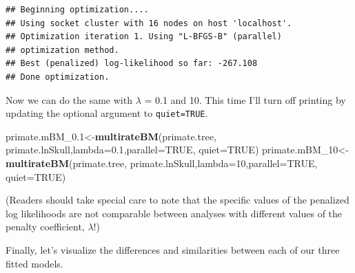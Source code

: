 \documentclass[fleqn,10pt,lineno]{wlpeerj} %
\newenvironment{Shaded}{\begin{snugshade}}{\end{snugshade}}
\newcommand{\AttributeTok}[1]{\textcolor[rgb]{0.13,0.29,0.53}{#1}}
\newcommand{\ConstantTok}[1]{\textcolor[rgb]{0.56,0.35,0.01}{#1}}
\newcommand{\DecValTok}[1]{\textcolor[rgb]{0.00,0.00,0.81}{#1}}
\newcommand{\FloatTok}[1]{\textcolor[rgb]{0.00,0.00,0.81}{#1}}
\newcommand{\FunctionTok}[1]{\textcolor[rgb]{0.13,0.29,0.53}{\textbf{#1}}}
\newcommand{\NormalTok}[1]{#1}
\newcommand{\OtherTok}[1]{\textcolor[rgb]{0.56,0.35,0.01}{#1}}
\begin{document}
\begin{verbatim}
## Beginning optimization....
## Using socket cluster with 16 nodes on host 'localhost'.
## Optimization iteration 1. Using "L-BFGS-B" (parallel) 
## optimization method.
## Best (penalized) log-likelihood so far: -267.108 
## Done optimization.
\end{verbatim}

Now we can do the same with \(\lambda\) = 0.1 and 10. This time I'll turn off printing by updating the optional argument to \texttt{quiet=TRUE}.

\begin{Shaded}
\begin{Highlighting}[]
\NormalTok{primate.mBM\_0}\FloatTok{.1}\OtherTok{\textless{}{-}}\FunctionTok{multirateBM}\NormalTok{(primate.tree,}
\NormalTok{  primate.lnSkull,}\AttributeTok{lambda=}\FloatTok{0.1}\NormalTok{,}\AttributeTok{parallel=}\ConstantTok{TRUE}\NormalTok{,}
  \AttributeTok{quiet=}\ConstantTok{TRUE}\NormalTok{)}
\NormalTok{primate.mBM\_10}\OtherTok{\textless{}{-}}\FunctionTok{multirateBM}\NormalTok{(primate.tree,}
\NormalTok{  primate.lnSkull,}\AttributeTok{lambda=}\DecValTok{10}\NormalTok{,}\AttributeTok{parallel=}\ConstantTok{TRUE}\NormalTok{,}
  \AttributeTok{quiet=}\ConstantTok{TRUE}\NormalTok{)}
\end{Highlighting}
\end{Shaded}

(Readers should take special care to note that the specific values of the penalized log likelihoods are not comparable between analyses with different values of the penalty coefficient, \(\lambda\)!)

Finally, let's visualize the differences and similarities between each of our three fitted models.
\end{document}
